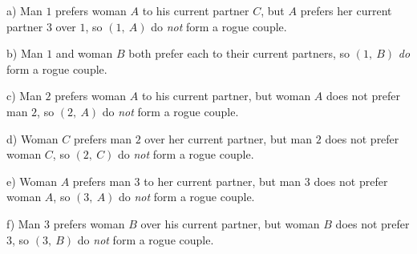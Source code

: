 \documentclass[11pt, preview]{standalone} %
\begin{document}
\begin{enumerate}
\begin{Multi}
\begin{enumerate}
a) Man $1$ prefers woman $A$ to his current partner $C$, but $A$ prefers her current partner $3$ over $1$, so $(1,\ A)$ do {\it not} form a rogue couple.

b) Man $1$ and woman $B$ both prefer each to their current partners, so $(1,\ B)$ {\it do} form a rogue couple.

c) Man $2$ prefers woman $A$ to his current partner, but woman $A$ does not prefer man $2$, so $(2,\ A)$ do {\it not} form a rogue couple.

d) Woman $C$ prefers man $2$ over her current partner, but man $2$ does not prefer woman $C$, so $(2,\ C)$ do {\it not} form a rogue couple.

e) Woman $A$ prefers man $3$ to her current partner, but man $3$ does not prefer woman $A$, so $(3,\ A)$ do {\it not} form a rogue couple.

f) Man $3$ prefers woman $B$ over his current partner, but woman $B$ does not prefer $3$, so $(3,\ B)$ do {\it not} form a rogue couple.
 

\end{enumerate}
\end{Multi}
\end{enumerate}
\end{document}
